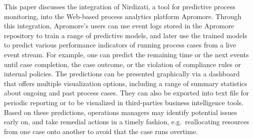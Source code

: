 This paper discusses the integration of Nirdizati, a tool for predictive process monitoring, into the Web-based process analytics platform Apromore. Through this integration, Apromore's users can use event logs stored in the Apromore repository to train a range of predictive models, and later use the trained models to predict various performance indicators of running process cases from a live event stream. For example, one can predict the remaining time or the next events until case completion, the case outcome, or the violation of compliance rules or internal policies. %
The predictions can be presented graphically via a dashboard that offers multiple visualization options, including a range of summary statistics about ongoing and past process cases. They can also be exported into text file for periodic reporting or to be visualized in third-parties business intelligence tools. Based on these predictions, operations managers may identify potential issues early on, and take remedial actions in a timely fashion, e.g.\ reallocating resources from one case onto another to avoid that the case runs overtime. %
